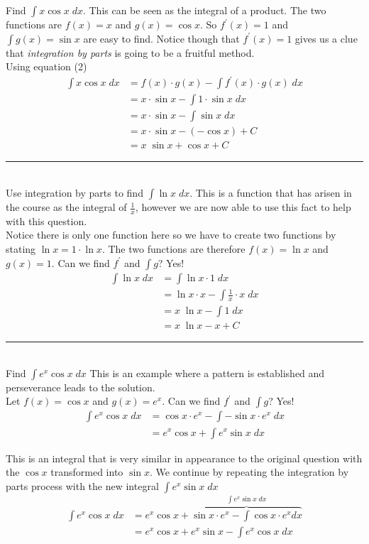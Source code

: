 \example Find $\int x \cos  x\; d x$. This can be seen as the integral of a product. The two functions
are $f (x) =x$ and $g (x) =\cos  x$. So $f^{ \prime } (x) =1$ and $\int g (x) =\sin  x$ are easy to find. Notice though that $f^{ \prime } (x) =1$ gives us a clue that \emph{integration by parts} is going to be a fruitful method. \\
\solution
Using equation (2)
\begin{align*}\int x \cos  x\; d x &  = f (x) \cdot g (x) -\int f^{ \prime } (x) \cdot g (x)\; d x \\
 &  = x \cdot \sin  x -\int 1 \cdot \sin  x\; d x \\
 &  = x \cdot \sin  x -\int \sin  x\; d x \\
 &  = x \cdot \sin  x -\left ( -\cos  x\right ) +C \\
 &  = x\; \sin  x +\cos  x +C\end{align*}
\rule{6.8cm}{0.5pt}\\
\example Use integration by parts to find $\int \ln  x\; d x$. This is a function that has arisen in the course as the integral of $\frac{1}{x}$, however we are now able to use this fact to help with this question. \\
\solution Notice there is only one function here so we have to create two functions by stating $\ln  x =1 \cdot \ln  x$. The two functions are therefore $f (x) =\ln  x$ and $g (x) =1$. Can we find $f^{ \prime }$ and $\int g$? Yes!
\begin{align*}\int \ln  x\; d x &  = \int \ln  x \cdot 1\; d x \\
 &  = \ln  x \cdot x -\int \frac{1}{x} \cdot x\; d x \\
 &  = x\; \ln  x -\int 1\; d x \\
 &  = x\; \ln  x -x +C\end{align*}
\rule{6.8cm}{0.5pt}\\
\example Find $\int e^{x} \cos  x\; d x$ This is an example where a pattern is established and perseverance leads to the solution. \\
\solution Let $f (x) =\cos  x$ and $g (x) =e^{x}$. Can we find $f^{ \prime }$ and $\int g$? Yes!
\begin{align*}\int e^{x} \cos  x\; d x &  = \cos  x \cdot e^{x} -\int  -\sin  x \cdot e^{x}\; d x \\
 &  = e^{x} \cos  x +\int e^{x} \sin  x\; d x\end{align*}

This is an integral that is very similar in appearance to the original question with the $\cos  x$ transformed into $\sin  x$. We continue by repeating the integration by parts process with the new integral
$\int e^{x} \sin  x\; d x$
\begin{align*}\int e^{x} \cos  x\; d x &  = e^{x} \cos  x +\overset{\int e^{x} \sin  x\; d x}{\overbrace{\sin  x \cdot e^{x} -\int \cos  x \cdot e^{x} d x}} \\
 &  = e^{x} \cos  x +e^{x} \sin  x -\int e^{x} \cos  x\; d x\end{align*}

